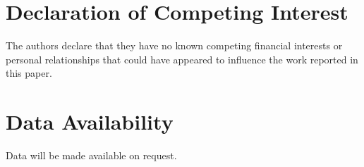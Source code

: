 \documentclass[journal]{IEEEtran}
\begin{document}
\section*{Declaration of Competing Interest}

The authors declare that they have no known competing
financial interests or personal relationships that could
have appeared to influence the work reported in this paper.

\section*{Data Availability}

Data will be made available on request.





\end{document}
